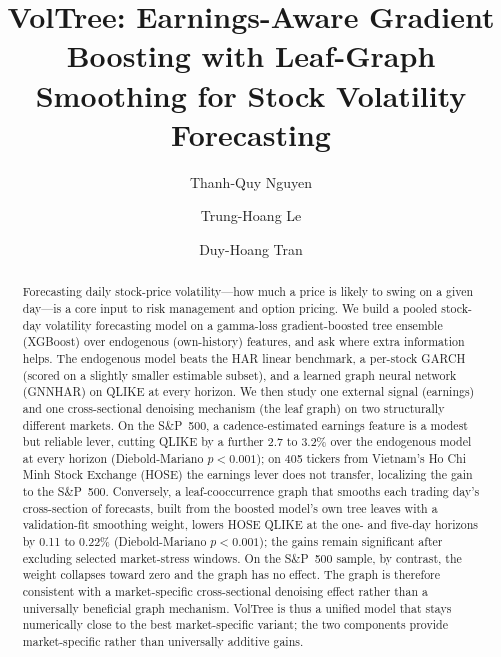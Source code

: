 \documentclass[runningheads,a4paper]{llncs}
\begin{document}
\title{VolTree: Earnings-Aware Gradient Boosting with Leaf-Graph Smoothing for Stock Volatility Forecasting}

\author{Thanh-Quy Nguyen \and Trung-Hoang Le \and Duy-Hoang Tran}

\maketitle
\pagestyle{empty}\thispagestyle{empty}   %

\begin{abstract}
Forecasting daily stock-price volatility---how much a price is likely to swing on a given day---is a core
input to risk management and option pricing. We build a pooled stock-day volatility forecasting model on a
gamma-loss gradient-boosted tree ensemble (XGBoost) over endogenous (own-history) features, and ask where
extra information helps. The endogenous model beats the HAR linear benchmark, a per-stock GARCH (scored on
a slightly smaller estimable subset), and a learned graph neural network (GNNHAR) on QLIKE at every
horizon. We then study one external signal (earnings) and one cross-sectional denoising mechanism (the leaf
graph) on two structurally different markets. On the S\&P~500, a cadence-estimated earnings feature is a
modest but reliable lever,
cutting QLIKE by a further 2.7 to 3.2\% over the endogenous model at every horizon (Diebold-Mariano
$p<0.001$); on 405 tickers from Vietnam's Ho Chi Minh Stock Exchange (HOSE) the earnings lever does not
transfer, localizing the gain to the S\&P~500. Conversely, a leaf-cooccurrence graph that smooths each trading day's
cross-section of forecasts, built from the boosted model's own tree leaves with a validation-fit smoothing
weight, lowers HOSE QLIKE at the one- and five-day horizons by 0.11 to 0.22\% (Diebold-Mariano $p<0.001$); the
gains remain significant after excluding selected market-stress windows. On the S\&P~500 sample, by
contrast, the weight collapses toward zero and the graph has no effect. The graph is therefore consistent with a
market-specific cross-sectional denoising effect rather than a universally beneficial graph mechanism.
VolTree is thus a unified model that stays numerically close to the best
market-specific variant; the two components provide market-specific rather than universally additive gains.
\end{abstract}
\end{document}
